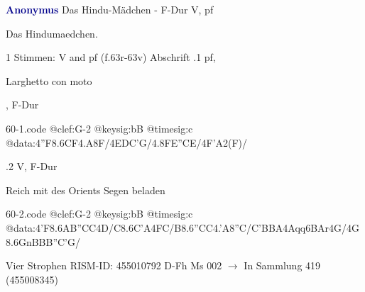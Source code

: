 \documentclass[twocolumn]{book}
\begin{document}
\newline \par \vspace{7pt} \textcolor{darkblue}{\textbf{Anonymus  }}
\newline Das Hindu-Mädchen - F-Dur
\newline V, pf
\newline \begin{itshape}[heading, f.63r:] Das Hindumaedchen.\end{itshape} 
\newline \textcolor{darkblue}{}  1 Stimmen: V and pf  (f.63r-63v)
\newline Abschrift
.1  pf, \begin{itshape}Larghetto con moto\end{itshape}, F-Dur  
\begin{filecontents*}{60-1.code}
@clef:G-2
@keysig:bB
@timesig:c
@data:4''F{8.6CF}4.A8F/4EDC'G/4.8FE''CE/4F'A2(F)/
\end{filecontents*}
\newline
%
.2  V, F-Dur
\newline \begin{footnotesize} Reich mit des Orients Segen beladen \end{footnotesize}  
\begin{filecontents*}{60-2.code}
@clef:G-2
@keysig:bB
@timesig:c
@data:4'F{8.6AB}{''CC}4D/C{8.6C'A}4FC/B{8.6''CC}4.'A8''C/C'BBA4Aqq6BAr4G/4G8.6GnB{BB}''C'G/
\end{filecontents*}
\newline
%
\newline Vier Strophen
\newline RISM-ID: 455010792
\newline D-Fh  Ms 002
\newline $\rightarrow$ In Sammlung 419 (455008345)
      
\end{document}
